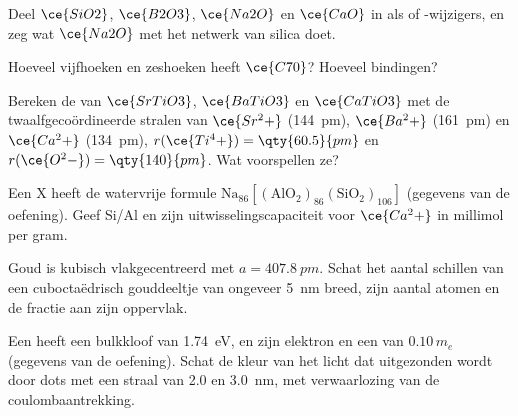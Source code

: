 \begin{exercise}[$\star$]\label{exo:b3:inorganic-materials:3}
Deel $\ce{SiO2}$, $\ce{B2O3}$, $\ce{Na2O}$ en $\ce{CaO}$ in als  of -wijzigers, en zeg wat
$\ce{Na2O}$ met het netwerk van silica doet.
\end{exercise}

\begin{exercise}[$\star$]\label{exo:b3:inorganic-materials:4}
Hoeveel vijfhoeken en zeshoeken heeft $\ce{C70}$? Hoeveel bindingen?
\end{exercise}

\begin{exercise}[$\star\star$]\label{exo:b3:inorganic-materials:5}
Bereken de  van $\ce{SrTiO3}$, $\ce{BaTiO3}$ en $\ce{CaTiO3}$ met de twaalfgecoördineerde stralen
van $\ce{Sr^2+}$ (\qty{144}{pm}), $\ce{Ba^2+}$ (\qty{161}{pm}) en $\ce{Ca^2+}$ (\qty{134}{pm}), $r(\ce{Ti^4+}) = \qty{60.5}{pm}$ en $r(\ce{O^2-}) = \qty{140}{pm}$. Wat
voorspellen ze?
\end{exercise}

\begin{exercise}[$\star\star$]\label{exo:b3:inorganic-materials:6}
Een  X heeft de watervrije formule $\mathrm{Na_{86}[(AlO_2)_{86}(SiO_2)_{106}]}$ (gegevens van de oefening).
Geef Si/Al en zijn uitwisselingscapaciteit voor $\ce{Ca^2+}$ in millimol per gram.
\end{exercise}

\begin{exercise}[$\star\star$]\label{exo:b3:inorganic-materials:7}
Goud is kubisch vlakgecentreerd met $a = \qty{407.8}{pm}$. Schat het aantal schillen van een
cuboctaëdrisch gouddeeltje van ongeveer \qty{5}{nm} breed, zijn aantal
atomen en de fractie aan zijn oppervlak.
\end{exercise}

\begin{exercise}[$\star\star$]\label{exo:b3:inorganic-materials:8}
Een  heeft een bulkkloof van \qty{1.74}{eV}, en zijn elektron en  een  van $0.10\,m_e$ (gegevens van de oefening). Schat de kleur van het licht dat uitgezonden wordt door
dots met een straal van 2.0 en \qty{3.0}{nm}, met verwaarlozing van de
coulombaantrekking.
\end{exercise}

